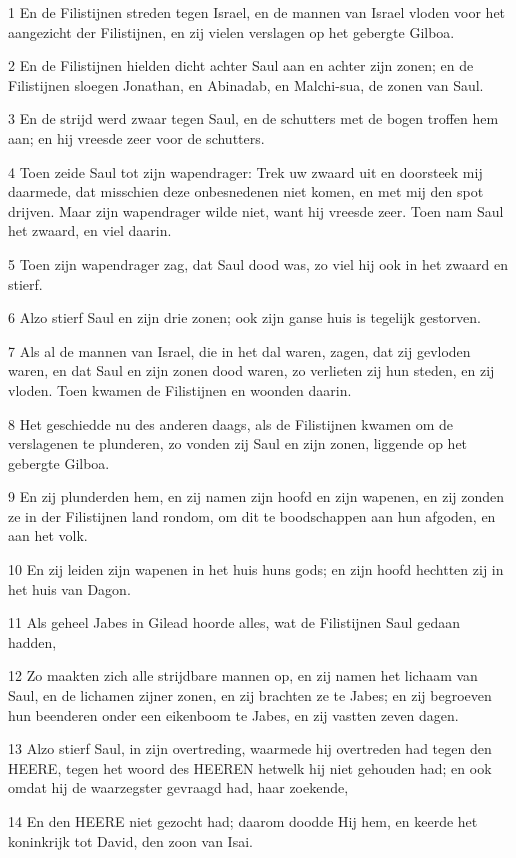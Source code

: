 \par 1 En de Filistijnen streden tegen Israel, en de mannen van Israel vloden voor het aangezicht der Filistijnen, en zij vielen verslagen op het gebergte Gilboa.
\par 2 En de Filistijnen hielden dicht achter Saul aan en achter zijn zonen; en de Filistijnen sloegen Jonathan, en Abinadab, en Malchi-sua, de zonen van Saul.
\par 3 En de strijd werd zwaar tegen Saul, en de schutters met de bogen troffen hem aan; en hij vreesde zeer voor de schutters.
\par 4 Toen zeide Saul tot zijn wapendrager: Trek uw zwaard uit en doorsteek mij daarmede, dat misschien deze onbesnedenen niet komen, en met mij den spot drijven. Maar zijn wapendrager wilde niet, want hij vreesde zeer. Toen nam Saul het zwaard, en viel daarin.
\par 5 Toen zijn wapendrager zag, dat Saul dood was, zo viel hij ook in het zwaard en stierf.
\par 6 Alzo stierf Saul en zijn drie zonen; ook zijn ganse huis is tegelijk gestorven.
\par 7 Als al de mannen van Israel, die in het dal waren, zagen, dat zij gevloden waren, en dat Saul en zijn zonen dood waren, zo verlieten zij hun steden, en zij vloden. Toen kwamen de Filistijnen en woonden daarin.
\par 8 Het geschiedde nu des anderen daags, als de Filistijnen kwamen om de verslagenen te plunderen, zo vonden zij Saul en zijn zonen, liggende op het gebergte Gilboa.
\par 9 En zij plunderden hem, en zij namen zijn hoofd en zijn wapenen, en zij zonden ze in der Filistijnen land rondom, om dit te boodschappen aan hun afgoden, en aan het volk.
\par 10 En zij leiden zijn wapenen in het huis huns gods; en zijn hoofd hechtten zij in het huis van Dagon.
\par 11 Als geheel Jabes in Gilead hoorde alles, wat de Filistijnen Saul gedaan hadden,
\par 12 Zo maakten zich alle strijdbare mannen op, en zij namen het lichaam van Saul, en de lichamen zijner zonen, en zij brachten ze te Jabes; en zij begroeven hun beenderen onder een eikenboom te Jabes, en zij vastten zeven dagen.
\par 13 Alzo stierf Saul, in zijn overtreding, waarmede hij overtreden had tegen den HEERE, tegen het woord des HEEREN hetwelk hij niet gehouden had; en ook omdat hij de waarzegster gevraagd had, haar zoekende,
\par 14 En den HEERE niet gezocht had; daarom doodde Hij hem, en keerde het koninkrijk tot David, den zoon van Isai.

